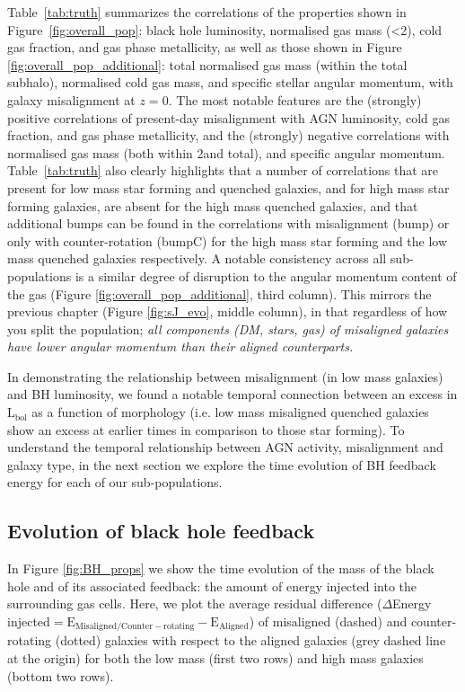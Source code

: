 Table~\ref{tab:truth} summarizes the correlations of the properties shown in Figure~\ref{fig:overall_pop}: black hole luminosity, normalised gas mass (<2\re), cold gas fraction, and gas phase metallicity, as well as those shown in Figure \ref{fig:overall_pop_additional}: total normalised gas mass (within the total subhalo), normalised cold gas mass, and specific stellar angular momentum, with galaxy misalignment at $z=0$. The most notable features are the (strongly) positive correlations of present-day misalignment with AGN luminosity, cold gas fraction, and gas phase metallicity, and the (strongly) negative correlations with normalised gas mass (both within 2\re and total), and specific angular momentum. Table~\ref{tab:truth} also clearly highlights that a number of correlations that are present for low mass star forming and quenched galaxies, and for high mass star forming galaxies, are absent for the high mass quenched galaxies, and that additional bumps can be found in the correlations with misalignment (bump) or only with counter-rotation (bumpC) for the high mass star forming and the low mass quenched galaxies respectively. A notable consistency across all sub-populations is a similar degree of disruption to the angular momentum content of the gas (Figure \ref{fig:overall_pop_additional}, third column). This mirrors the previous chapter (Figure \ref{fig:sJ_evo}, middle column), in that regardless of how you split the population; \textit{all components (DM, stars, gas) of misaligned galaxies have lower angular momentum than their aligned counterparts.}

In demonstrating the relationship between misalignment (in low mass galaxies) and BH luminosity, we found a notable temporal connection between an excess in $\mathrm{L_{bol}}$ as a function of morphology (i.e. low mass misaligned quenched galaxies show an excess at earlier times in comparison to those star forming). To understand the temporal relationship between AGN activity, misalignment and galaxy type, in the next section we explore the time evolution of BH feedback energy for each of our sub-populations.

\subsection{Evolution of black hole feedback} \label{sec:evolution}
In Figure \ref{fig:BH_props} we show the time evolution of the mass of the black hole and of its associated feedback: the amount of energy injected into the surrounding gas cells. Here, we plot the average residual difference ($\Delta$Energy injected$\mathrm{ = E_{Misaligned/Counter-rotating} - E_{Aligned}}$) of misaligned (dashed) and counter-rotating (dotted) galaxies with respect to the aligned galaxies (grey dashed line at the origin) for both the low mass (first two rows) and high mass galaxies (bottom two rows).

